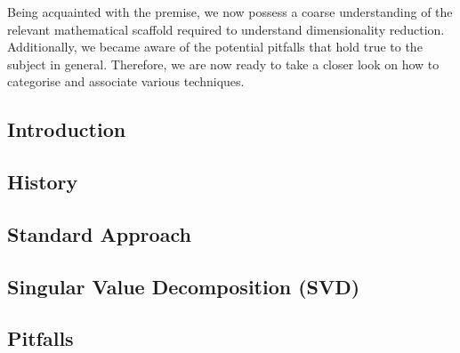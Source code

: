 Being acquainted with the premise, we now possess a coarse understanding of the relevant mathematical scaffold required to understand dimensionality reduction.
Additionally, we became aware of the potential pitfalls that hold true to the subject in general.
Therefore, we are now ready to take a closer look on how to categorise and associate various techniques.




\subsection{Introduction}


\clearpage




\subsection{History}

\clearpage




\subsection{Standard Approach}

\clearpage




\subsection{Singular Value Decomposition (SVD)}

\clearpage




\subsection{Pitfalls}

\clearpage

